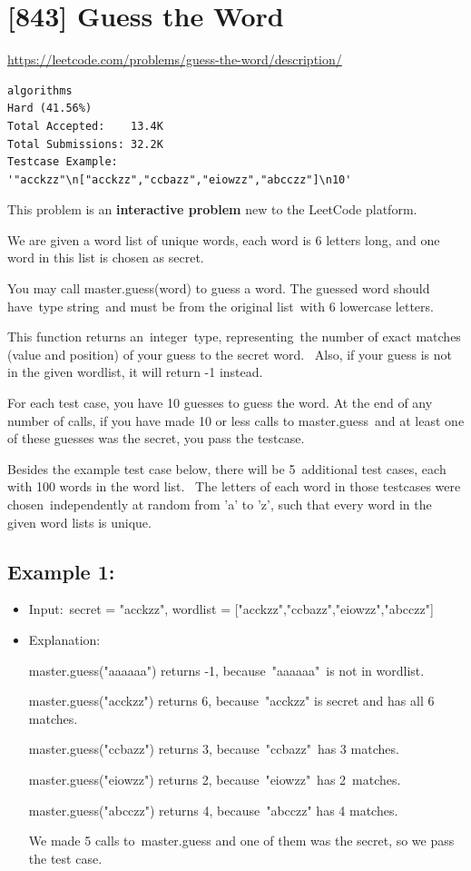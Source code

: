 \documentclass[11pt]{article}
\author{adam}
\date{\today}
\title{}
\begin{document}
\tableofcontents


\section{[843] Guess the Word}
\label{sec:orgd790762}
\url{https://leetcode.com/problems/guess-the-word/description/}

\begin{verbatim}
algorithms
Hard (41.56%)
Total Accepted:    13.4K
Total Submissions: 32.2K
Testcase Example:
'"acckzz"\n["acckzz","ccbazz","eiowzz","abcczz"]\n10'
\end{verbatim}

This problem is an \textbf{interactive problem} new to the LeetCode platform.

We are given a word list of unique words, each word is 6 letters long, and
one word in this list is chosen as secret.

You may call master.guess(word) to guess a word. The guessed
word should have type string and must be from the original list with 6
lowercase letters.

This function returns an integer type, representing the number of exact
matches (value and position) of your guess to the secret word.  Also, if your
guess is not in the given wordlist, it will return -1 instead.

For each test case, you have 10 guesses to guess the word. At the end of any
number of calls, if you have made 10 or less calls to master.guess and at
least one of these guesses was the secret, you pass the testcase.

Besides the example test case below, there will be 5 additional test cases,
each with 100 words in the word list.  The letters of each word in those
testcases were chosen independently at random from 'a' to 'z', such that
every word in the given word lists is unique.

\subsection{Example 1:}
\label{sec:org9547464}
\begin{itemize}
\item Input: secret = "acckzz", wordlist = ["acckzz","ccbazz","eiowzz","abcczz"]

\item Explanation:

master.guess("aaaaaa") returns -1, because "aaaaaa" is not in wordlist.

master.guess("acckzz") returns 6, because "acckzz" is secret and has
all 6 matches.

master.guess("ccbazz") returns 3, because "ccbazz" has 3 matches.

master.guess("eiowzz") returns 2, because "eiowzz" has 2 matches.

master.guess("abcczz") returns 4, because "abcczz" has 4 matches.

We made 5 calls to master.guess and one of them was the secret, so we pass
the test case.
\end{itemize}
\end{document}
